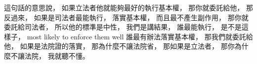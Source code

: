 \hypertarget{w06:cue:2166}{}這句話的意思說，
\hypertarget{w06:cue:2167}{}如果立法者他就能夠最好的執行基本權，
\hypertarget{w06:cue:2168}{}那你就委託給他，
\hypertarget{w06:cue:2169}{}那反過來，
\hypertarget{w06:cue:2170}{}如果是司法者最能執行，
\hypertarget{w06:cue:2171}{}落實基本權，
\hypertarget{w06:cue:2172}{}而且最不產生副作用，
\hypertarget{w06:cue:2173}{}那你就委託給司法者，
\hypertarget{w06:cue:2174}{}所以他的標準是中性，
\hypertarget{w06:cue:2175}{}我們是講結果，
\hypertarget{w06:cue:2176}{}誰最能執行，
\hypertarget{w06:cue:2177}{}是不是這樣子，
\hypertarget{w06:cue:2178}{}most likely to enforce them well
\hypertarget{w06:cue:2179}{}誰最有辦法落實基本權，
\hypertarget{w06:cue:2180}{}那我們就委託給他，
\hypertarget{w06:cue:2181}{}如果是法院證的落實，
\hypertarget{w06:cue:2182}{}那為什麼不讓法院省，
\hypertarget{w06:cue:2183}{}那如果是立法者，
\hypertarget{w06:cue:2184}{}那你為什麼不讓法院，
\hypertarget{w06:cue:2185}{}我就聽不懂。

